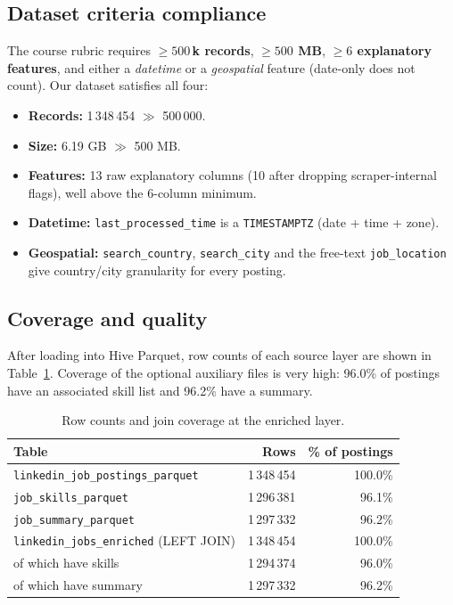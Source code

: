 \documentclass[11pt,a4paper]{article}
\begin{document}
\subsection{Dataset criteria compliance}
The course rubric \cite{bs-final-project} requires
\textbf{$\geq 500$\,k records}, \textbf{$\geq 500$ MB}, \textbf{$\geq
6$ explanatory features}, and either a \emph{datetime} or a
\emph{geospatial} feature (date-only does not count).  Our dataset
satisfies all four:

\begin{itemize}[leftmargin=*]
  \item \textbf{Records:} 1\,348\,454 $\gg$ 500\,000.
  \item \textbf{Size:} 6.19 GB $\gg$ 500 MB.
  \item \textbf{Features:} 13 raw explanatory columns (10 after
    dropping scraper-internal flags), well above the 6-column
    minimum.
  \item \textbf{Datetime:} \texttt{last\_processed\_time} is a
    \texttt{TIMESTAMPTZ} (date + time + zone).
  \item \textbf{Geospatial:} \texttt{search\_country},
    \texttt{search\_city} and the free-text \texttt{job\_location}
    give country/city granularity for every posting.
\end{itemize}

\subsection{Coverage and quality}
After loading into Hive Parquet, row counts of each source layer are
shown in Table~\ref{tab:counts}.  Coverage of the optional auxiliary
files is very high: 96.0\% of postings have an associated skill list
and 96.2\% have a summary.

\begin{table}[h]
\centering
\caption{Row counts and join coverage at the enriched layer.}
\label{tab:counts}
\small
\begin{tabular}{lrr}
\toprule
\textbf{Table} & \textbf{Rows} & \textbf{\% of postings} \\
\midrule
\texttt{linkedin\_job\_postings\_parquet}  & 1\,348\,454 & 100.0\% \\
\texttt{job\_skills\_parquet}              & 1\,296\,381 & 96.1\%  \\
\texttt{job\_summary\_parquet}             & 1\,297\,332 & 96.2\%  \\
\texttt{linkedin\_jobs\_enriched} (LEFT JOIN) & 1\,348\,454 & 100.0\% \\
\quad of which have skills                    & 1\,294\,374 & 96.0\% \\
\quad of which have summary                   & 1\,297\,332 & 96.2\% \\
\bottomrule
\end{tabular}
\end{table}
\end{document}
